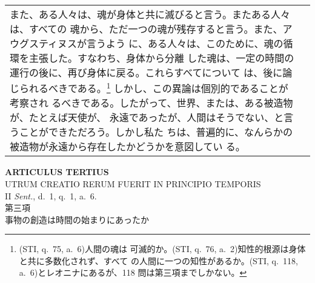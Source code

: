 \documentclass[10pt]{jsarticle} %
\begin{document}
\begin{longtable}{p{21em}p{21em}}
また、ある人々は、魂が身体と共に滅びると言う。またある人々は、すべての
魂から、ただ一つの魂が残存すると言う。また、アウグスティヌスが言うよう
に、ある人々は、このために、魂の循環を主張した。すなわち、身体から分離
した魂は、一定の時間の運行の後に、再び身体に戻る。これらすべてについて
は、後に論じられるべきである。\footnote {(STI, q.~75, a.~6)人間の魂は
可滅的か。(STI, q.~76, a.~2)知性的根源は身体と共に多数化されず、すべて
の人間に一つの知性があるか。(STI, q.~118, a.~6)とレオニナにあるが、118
問は第三項までしかない。} しかし、この異論は個別的であることが考察され
るべきである。したがって、世界、または、ある被造物が、たとえば天使が、
永遠であったが、人間はそうでない、と言うことができただろう。しかし私た
ちは、普遍的に、なんらかの被造物が永遠から存在したかどうかを意図してい
る。

\\

\end{longtable}

\newpage
{}
\begin{center}
 {\Large {\bf ARTICULUS TERTIUS}}\\
 {\large UTRUM CREATIO RERUM FUERIT IN PRINCIPIO TEMPORIS}\\
 {\footnotesize II {\itshape Sent.}, d.~1, q.~1, a.~6.}\\
 {\Large 第三項\\事物の創造は時間の始まりにあったか}
\end{center}
\end{document}

